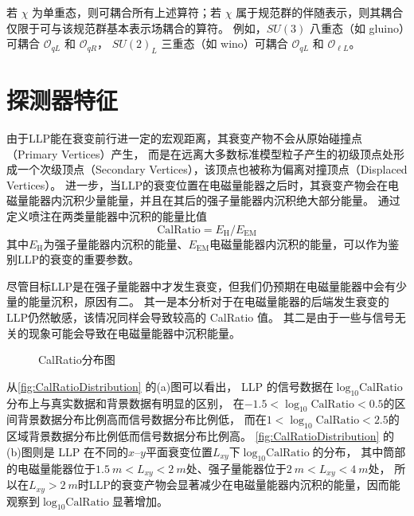 若 $\chi$ 为单重态，则可耦合所有上述算符；若 $\chi$ 属于规范群的伴随表示，则其耦合仅限于可与该规范群基本表示场耦合的算符。
例如，$SU(3)$ 八重态（如 gluino）可耦合 $\mathcal{O}_{qL}$ 和 $\mathcal{O}_{qR}$，
$SU(2)_L$ 三重态（如 wino）可耦合 $\mathcal{O}_{qL}$ 和 $\mathcal{O}_{\ell L}$。


\section{探测器特征}
由于LLP能在衰变前行进一定的宏观距离，其衰变产物不会从原始碰撞点（Primary Vertices）产生，
而是在远离大多数标准模型粒子产生的初级顶点处形成一个次级顶点（Secondary Vertices），该顶点也被称为偏离对撞顶点（Displaced Vertices）。
进一步，当LLP的衰变位置在电磁量能器之后时，其衰变产物会在电磁量能器内沉积少量能量，并且在其后的强子量能器内沉积绝大部分能量。
通过定义喷注在两类量能器中沉积的能量比值$$\text{CalRatio}=E_{\text{H}}/E_{\text{EM}}$$
其中$E_{\text{H}}$为强子量能器内沉积的能量、$E_{\text{EM}}$电磁量能器内沉积的能量，可以作为鉴别LLP的衰变的重要参数。
\cite{calratio}

尽管目标LLP是在强子量能器中才发生衰变，但我们仍预期在电磁量能器中会有少量的能量沉积，原因有二。
其一是本分析对于在电磁量能器的后端发生衰变的LLP仍然敏感，该情况同样会导致较高的 CalRatio 值。
其二是由于一些与信号无关的现象可能会导致在电磁量能器中沉积能量。

\begin{figure}[ht]
    \centering
    \hfill
    \hfill
    \hfill
    \caption{CalRatio分布图\cite{ATLAS:2022zhj}}
    \label{fig:CalRatioDistribution}
\end{figure}

从\autoref{fig:CalRatioDistribution} 的(a)图可以看出，
LLP 的信号数据在$\log_{10}\text{CalRatio}$分布上与真实数据和背景数据有明显的区别，
在$-1.5<\log_{10}\text{CalRatio}<0.5$的区间背景数据分布比例高而信号数据分布比例低，
而在$1<\log_{10}\text{CalRatio}<2.5$的区域背景数据分布比例低而信号数据分布比例高。
\autoref{fig:CalRatioDistribution} 的(b)图则是 LLP 在不同的$x$--$y$平面衰变位置$L_{xy}$下$\log_{10}\text{CalRatio}$的分布，
其中筒部的电磁量能器位于$\SI{1.5}{m} < L_{xy} < \SI{2}{m}$处、强子量能器位于$\SI{2}{m} < L_{xy} < \SI{4}{m}$处，
所以在$L_{xy} > \SI{2}{m}$时LLP的衰变产物会显著减少在电磁量能器内沉积的能量，因而能观察到$\log_{10}\text{CalRatio}$显著增加。

